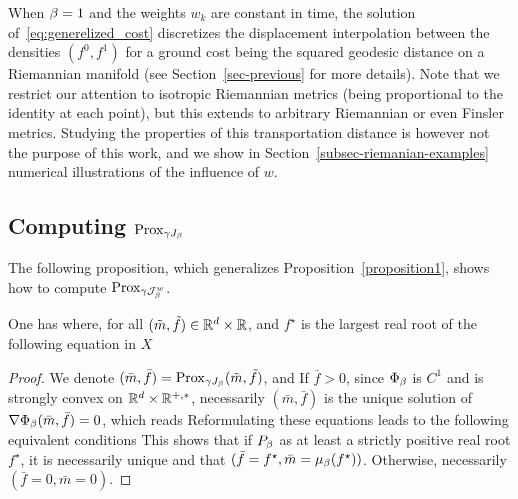 When $\beta=1$ and the weights $w_k$ are constant in time, the solution of~\eqref{eq:generelized_cost} discretizes the displacement interpolation between the densities $(f^0,f^1)$ for a ground cost being the squared geodesic distance on a Riemannian manifold (see Section~\ref{sec-previous} for more details). Note that we restrict our attention to isotropic Riemannian metrics (being proportional to the identity at each point), but this extends to arbitrary Riemannian or even Finsler metrics.  Studying the properties of this transportation distance is however not the purpose of this work, and we show in Section~\ref{subsec-riemanian-examples} numerical illustrations of the influence of $w$. 


\subsection{Computing $\operatorname{Prox}_{\gamma J_\beta}$}


The following proposition, which generalizes Proposition~\ref{proposition1}, shows how to compute $\operatorname{Prox}_{\gamma \mathcal{J}_\beta^w}$.

\begin{prop}\label{prop-generalized}
	One has
	where, for all $(\tilde m,\tilde f) \in \mathbb{R}^d \times \mathbb{R}$, 
	and $f^\star$ is the largest real root of the following equation in $X$
\end{prop}
\begin{proof}
	We denote $(\bar m,\bar f) = \operatorname{Prox}_{\gamma J_\beta}(\tilde m,\tilde f)$, and
	If $\bar f > 0$, since $\Phi_\beta$ is $C^1$ and is strongly convex on $\mathbb{R}^{d} \times \mathbb{R}^{+,*}$, 
	necessarily $(\bar m,\bar f)$ is the unique solution of $\nabla \Phi_\beta(\bar m,\bar f)=0$, which reads
	Reformulating these equations leads to the following equivalent conditions
	This shows that if $P_\beta$ as at least a strictly positive real root $f^\star$, it is necessarily unique and that $(\bar f=f^\star,\bar m=\mu_\beta(f^\star))$. Otherwise, necessarily $(\bar f = 0, \bar m = 0)$.
\end{proof}

